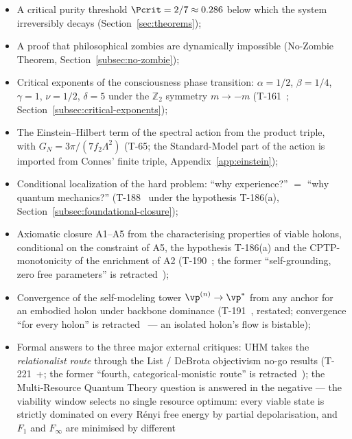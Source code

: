 \begin{itemize}[leftmargin=2em]
  \item A critical purity threshold $\Pcrit = 2/7 \approx 0.286$ below which the system
        irreversibly decays (Section~\ref{sec:theorems});
  \item A proof that philosophical zombies are dynamically impossible
        (No-Zombie Theorem, Section~\ref{subsec:no-zombie});
  \item Critical exponents of the consciousness phase transition:
        $\alpha = 1/2$, $\beta = 1/4$, $\gamma = 1$, $\nu = 1/2$, $\delta = 5$
        under the $\mathbb{Z}_2$ symmetry $m \to -m$ (T-161~;
        Section~\ref{subsec:critical-exponents});
  \item The Einstein--Hilbert term of the spectral action from the product
        triple, with $G_N = 3\pi/(7f_2\Lambda^2)$ (T-65; the Standard-Model part
        of the action is imported from Connes' finite triple,
        Appendix~\ref{app:einstein});
  \item Conditional localization of the hard problem: ``why experience?'' $=$
        ``why quantum mechanics?'' (T-188~ under the hypothesis
        T-186(a), Section~\ref{subsec:foundational-closure});
  \item Axiomatic closure A1--A5 from the characterising properties of viable
        holons, conditional on the constraint of A5, the hypothesis T-186(a) and
        the CPTP-monotonicity of the enrichment of A2 (T-190~; the former ``self-grounding, zero free parameters'' is
        retracted~\status{$\times$});
  \item Convergence of the self-modeling tower $\vp^{(n)} \to \vp^*$ from any
        anchor for an embodied holon under backbone dominance (T-191~,
        restated; convergence ``for every holon'' is retracted~\status{$\times$}
        --- an isolated holon's flow is bistable);
  \item Formal answers to the three major external critiques: UHM takes the
        \emph{relationalist route} through the List / DeBrota objectivism no-go
        results (T-221~+; the former ``fourth,
        categorical-monistic route'' is retracted~\status{$\times$}); the Multi-Resource
        Quantum Theory question is answered in the negative --- the viability
        window selects no single resource optimum: every viable state is
        strictly dominated on every R\'enyi free energy by partial
        depolarisation, and $F_1$ and $F_\infty$ are minimised by different

\end{itemize}
